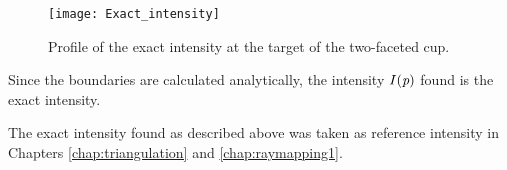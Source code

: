 \begin{figure}[htbp]
\centering
\texttt{[image: Exact\_intensity]}
\caption{Profile of the exact intensity at the target of the two-faceted cup.}
\label{fig:intensity_cup_analytic}
\end{figure}
Since the boundaries are calculated analytically, the intensity $I(\textit{p})$ found is the exact intensity.

The exact intensity found as described above was taken as reference intensity in Chapters \ref{chap:triangulation} and \ref{chap:raymapping1}.

